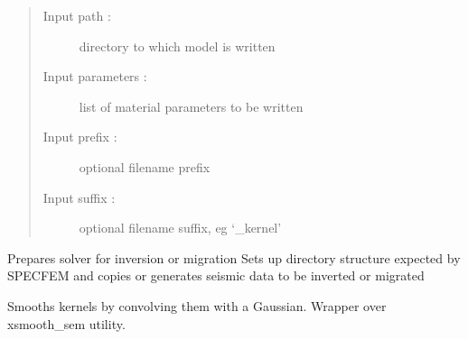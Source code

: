 \documentclass[letterpaper,10pt,english]{sphinxmanual}
\begin{document}
\begin{fulllineitems}
\begin{fulllineitems}
\begin{quote}
\begin{description}
\item[{Input path :}] \leavevmode
directory to which model is written

\item[{Input parameters :}] \leavevmode
list of material parameters to be written

\item[{Input prefix :}] \leavevmode
optional filename prefix

\item[{Input suffix :}] \leavevmode
optional filename suffix, eg ‘\_kernel’

\end{description}\end{quote}

\end{fulllineitems}


\begin{fulllineitems}
\label{\detokenize{ref/seisflows.solver:seisflows.solver.base.base.setup}}
Prepares solver for inversion or migration
Sets up directory structure expected by SPECFEM and copies or
generates seismic data to be inverted or migrated

\end{fulllineitems}


\begin{fulllineitems}
\label{\detokenize{ref/seisflows.solver:seisflows.solver.base.base.smooth}}
Smooths kernels by convolving them with a Gaussian.  Wrapper over
xsmooth\_sem utility.

\end{fulllineitems}


\begin{fulllineitems}
\label{\detokenize{ref/seisflows.solver:seisflows.solver.base.base.source_name}}
\end{fulllineitems}


\end{fulllineitems}
\end{document}

